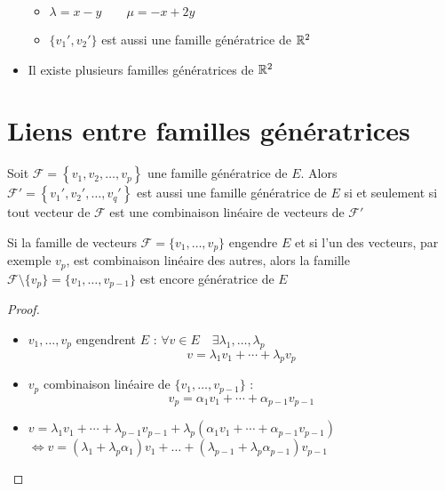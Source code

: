 \begin{frame}
\begin{exemple}
\begin{itemize}
\begin{itemize}
\pause\pause
\item
$\lambda =x -y\qquad \mu =-x+2y$

\pause
\item $\{v_1', v_2'\}$ est aussi une famille g\'en\'eratrice de $\mathbb{R}^2$
\end{itemize}

\pause
\item Il existe plusieurs familles g\'en\'eratrices de $\mathbb{R}^2$
\end{itemize}
\end{exemple}
\end{frame}

\section{Liens entre familles génératrices}

\begin{frame}
\begin{proposition}
Soit $\mathcal{F} = \left\{ v_1, v_2, \dots , v_p\right\}$ une famille génératrice de $E$.
Alors $\mathcal{F}' = \left\{ v_1', v_2', \dots , v_q'\right\}$ est aussi une famille
génératrice de $E$ si et seulement si tout vecteur de $\mathcal{F}$ 
est une combinaison linéaire de vecteurs de $\mathcal{F}'$
\end{proposition}


\end{frame}


\begin{frame}
\begin{proposition}
Si la famille de vecteurs  $\mathcal{F} =\{v_1,\ldots,v_p\}$ engendre $E$ et si l'un des vecteurs, 
par exemple $v_p$, est combinaison linéaire des autres, alors la famille 
$\mathcal{F}  \setminus \{v_p\}= \{v_1,\dots ,v_{p-1}\}$
est encore  génératrice de $E$
\end{proposition}


\pause
\begin{proof}
\begin{itemize}
\item
$v_1,\dots ,v_p$ engendrent $E$ : $\forall v \in E\quad\exists \lambda_1, \ldots, \lambda_p$
$$v=\lambda_1 v_1+ \cdots + \lambda_p v_p$$

\pause
\item $v_p$ combinaison lin\'eaire de $\{v_1,\dots ,v_{p-1}\}$ : 
$$v_p = \alpha_1 v_1 + \cdots + \alpha_{p-1}v_{p-1}$$


\pause
\item
$v = \lambda_1 v_1+ \cdots + \lambda_{p-1}v_{p-1} + \lambda_{p}
\left( \alpha_1 v_1+\cdots+\alpha_{p-1}v_{p-1} \right)$
$
\iff v=\left ( \lambda_1+\lambda_{p}\alpha_1\right )v_1+\dots + 
 \left ( \lambda_{p-1}+\lambda_{p}\alpha_{p-1}\right )v_{p-1}$
 \end{itemize}
\end{proof}


\end{frame}



